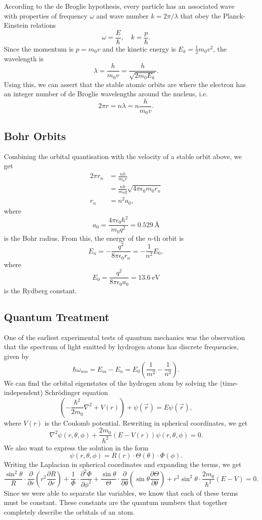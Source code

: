 \documentclass{article}
\begin{document}
According to the de Broglie hypothesis, every particle has an associated wave with properties of frequency $\omega $ and wave number $k=2\pi /\lambda $ that obey the Planck-Einstein relations 
\[
    \omega =\frac{E}{\hbar},\quad k=\frac{p}{\hbar }.
\]
Since the momentum is $p=m_0v$ and the kinetic energy is $E_k=\frac{1}{2}m_0v^2$, the wavelength is 
\[
    \lambda =\frac{h}{m_0v}=\frac{h}{\sqrt{2m_0E_k}}.
\]
Using this, we can assert that the stable atomic orbits are where the electron has an integer number of de Broglie wavelengths around the nucleus, i.e. 
\[
    2\pi r=n\lambda =n \frac{h}{m_0v}.
\]

\subsection{Bohr Orbits}
Combining the orbital quantisation with the velocity of a stable orbit above, we get 
\begin{align*}
    2\pi r_n &= \frac{nh}{m_0v}\\
             &=\frac{nh}{m_0q}\sqrt{4\pi \epsilon _0m_0r_n}\\
    r_n&=n^2a_0,
\end{align*}
where 
\[
    a_0=\frac{4\pi \epsilon _0 \hbar^2}{m_0q^2}=\SI{0.529}{\angstrom}
\]
is the Bohr radius. From this, the energy of the $n$-th orbit is 
\[
    E_n=-\frac{q^2}{8\pi \epsilon _0r_n}=-\frac{1}{n^2}E_0,
\]
where 
\[
    E_0=\frac{q^2}{8\pi \epsilon _0a_0}=\SI{13.6}{\electronvolt}
\]
is the Rydberg constant.

\subsection{Quantum Treatment}
One of the earliest experimental tests of quantum mechanics was the observation that the spectrum of light emitted by hydrogen atoms has discrete frequencies, given by 
\[
    \hbar\omega _{mn}=E_m-E_n=E_0 \left( \frac{1}{m^2}-\frac{1}{n^2} \right).
\]
We can find the orbital eigenstates of the hydrogen atom by solving the (time-independent) Schr\"odinger equation 
\[
    \left( -\frac{\hbar^2}{2m_0}\nabla^2+V(r) \right)+\psi (\vec{r})=E\psi (\vec{r}),
\]
where $V(r) $ is the Coulomb potential. Rewriting in spherical coordinates, we get 
\[
    \nabla^2\psi \left( r,\theta ,\phi  \right)+\frac{2m_0}{\hbar^2}\left( E-V(r) \right)\psi (r,\theta ,\phi )=0.
\]
We also want to express the solution in the form 
\[
    \psi (r,\theta ,\phi )=R(r)\cdot\Theta (\theta )\cdot \Phi (\phi ).
\]
Writing the Laplacian in spherical coordinates and expanding the terms, we get 
\[
    \frac{\sin^2\theta }{R}\cdot \frac{\partial }{\partial r}\left( r^2 \frac{\partial R}{\partial r} \right)+\frac{1}{\Phi}\cdot \frac{\partial^2\Phi}{\partial \phi^2}+\frac{\sin\theta }{\Theta}\cdot \frac{\partial }{\partial \theta }\left( \sin\theta \frac{\partial \Theta}{\partial \theta } \right)+r^2\sin^2\theta \cdot \frac{2m_0}{\hbar^2}\left( E-V \right)=0.
\]
Since we were able to separate the variables, we know that each of these terms must be constant. These constants are the quantum numbers that together completely describe the orbitals of an atom.
\end{document}
